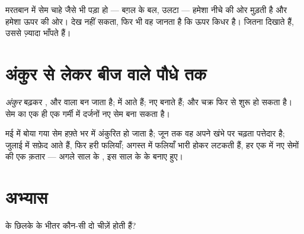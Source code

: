 \begin{remark}[जड़ नीचे, अंकुर ऊपर --- हमेशा]\label{rem:g2:from-seed-to-plant:updown}
मरतबान में सेम चाहे जैसे भी पड़ा हो --- बग़ल के बल, उलटा ---  हमेशा
नीचे की ओर मुड़ती है और  हमेशा ऊपर की ओर।  देख नहीं सकता,
फिर भी वह जानता है कि ऊपर किधर है।  जितना दिखाते हैं, उससे ज़्यादा
भाँपते हैं।
\end{remark}

\section{अंकुर से लेकर बीज वाले पौधे तक}

\begin{proposition}[पौधे का जीवन चक्र]\label{prop:g2:from-seed-to-plant:cycle}
\emph{अंकुर} बढ़कर ,  और  वाला  बन
जाता है;  में  आते हैं;  नए \emph{} बनाते हैं; और चक्र
फिर से शुरू हो सकता है। सेम का एक ही  एक गर्मी में दर्जनों नए सेम
बना सकता है।
\end{proposition}
\admitted

\begin{example}[एक सेम, एक गर्मी]\label{ex:g2:from-seed-to-plant:summer}
मई में बोया गया सेम हफ़्ते भर में अंकुरित हो जाता है; जून तक वह अपने
खंभे पर चढ़ता पत्तेदार  है; जुलाई में सफ़ेद  आते हैं, फिर हरी
फलियाँ; अगस्त में फलियाँ भारी होकर लटकती हैं, हर एक में नए सेमों की
एक क़तार --- अगले साल के , इस साल के  के बनाए हुए।
\end{example}

\section{अभ्यास}

\begin{exercise}[$\star$]\label{exo:g2:from-seed-to-plant:1}
 के छिलके के भीतर कौन-सी दो चीज़ें होती हैं?
\end{exercise}

